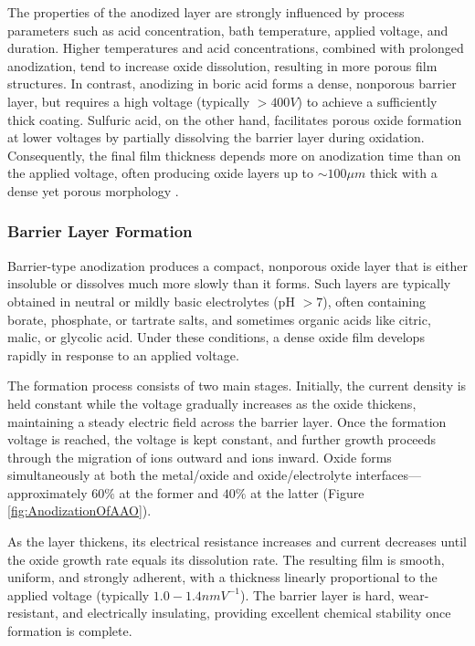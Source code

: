 \documentclass{rapportCS}
\begin{document}
	The properties of the anodized layer are strongly influenced by process parameters such as acid concentration, bath temperature, applied voltage, and duration. Higher temperatures and acid concentrations, combined with prolonged anodization, tend to increase oxide dissolution, resulting in more porous film structures. In contrast, anodizing in boric acid forms a dense, nonporous barrier layer, but requires a high voltage (typically $> 400 V$) to achieve a sufficiently thick coating. Sulfuric acid, on the other hand, facilitates porous oxide formation at lower voltages by partially dissolving the barrier layer during oxidation. Consequently, the final film thickness depends more on anodization time than on the applied voltage, often producing oxide layers up to $\sim 100 \mu m$ thick with a dense yet porous morphology \cite{eessaa2023review}.
	
	\subsubsection{Barrier Layer Formation}
	
	Barrier-type anodization produces a compact, nonporous oxide layer that is either insoluble or dissolves much more slowly than it forms. Such layers are typically obtained in neutral or mildly basic electrolytes (pH $> 7$), often containing borate, phosphate, or tartrate salts, and sometimes organic acids like citric, malic, or glycolic acid. Under these conditions, a dense oxide film develops rapidly in response to an applied voltage.
	
	The formation process consists of two main stages. Initially, the current density is held constant while the voltage gradually increases as the oxide thickens, maintaining a steady electric field across the barrier layer. Once the formation voltage is reached, the voltage is kept constant, and further growth proceeds through the migration of  ions outward and  ions inward. Oxide forms simultaneously at both the metal/oxide and oxide/electrolyte interfaces—approximately $60\%$ at the former and $40\%$ at the latter (Figure \ref{fig:AnodizationOfAAO}).
	
	As the layer thickens, its electrical resistance increases and current decreases until the oxide growth rate equals its dissolution rate. The resulting film is smooth, uniform, and strongly adherent, with a thickness linearly proportional to the applied voltage (typically $1.0 - 1.4 nm V^{-1}$). The barrier layer is hard, wear-resistant, and electrically insulating, providing excellent chemical stability once formation is complete.
	
\end{document}
